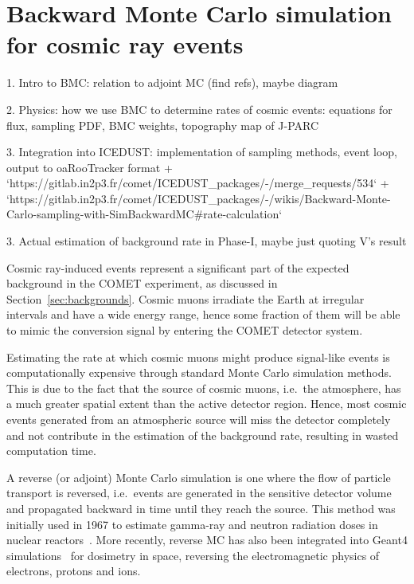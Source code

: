 \chapter{Backward Monte Carlo simulation for cosmic ray events}\label{ch:cosmics}

\begin{markdown}

1. Intro to BMC: relation to adjoint MC (find refs), maybe diagram

2. Physics: how we use BMC to determine rates of cosmic events: equations for
flux, sampling PDF, BMC weights, topography map of J-PARC

3. Integration into ICEDUST: implementation of sampling methods, event loop, output to
oaRooTracker format
+ `https://gitlab.in2p3.fr/comet/ICEDUST_packages/-/merge_requests/534`
+ `https://gitlab.in2p3.fr/comet/ICEDUST_packages/-/wikis/Backward-Monte-Carlo-sampling-with-SimBackwardMC#rate-calculation`

3. Actual estimation of background rate in Phase-I, maybe just quoting V's
result


\end{markdown}

Cosmic ray-induced events represent a significant part of the expected
background in the COMET experiment, as discussed in
Section~\ref{sec:backgrounds}. Cosmic muons irradiate the Earth at irregular
intervals and have a wide energy range, hence some fraction of them will be able
to mimic the conversion signal by entering the COMET detector system. 

Estimating the rate at which cosmic muons might produce signal-like events is
computationally expensive through standard Monte Carlo simulation methods. This
is due to the fact that the source of cosmic muons, i.e.\ the atmosphere, has a
much greater spatial extent than the active detector region. Hence, most cosmic
events generated from an atmospheric source will miss the detector completely
and not contribute in the estimation of the background rate, resulting in wasted
computation time.

A reverse (or adjoint) Monte Carlo simulation is one where the flow of particle
transport is reversed, i.e.\ events are generated in the sensitive detector
volume and propagated backward in time until they reach the source. This method
was initially used in 1967 to estimate gamma-ray and neutron radiation doses in
nuclear reactors~\cite{doi:10.13182/NSE68-A19235,doi:10.13182/NSE69-A19116}.
More recently, reverse MC has also been integrated into Geant4
simulations~\cite{DESORGHER2010247} for dosimetry in space, reversing the
electromagnetic physics of electrons, protons and ions.

